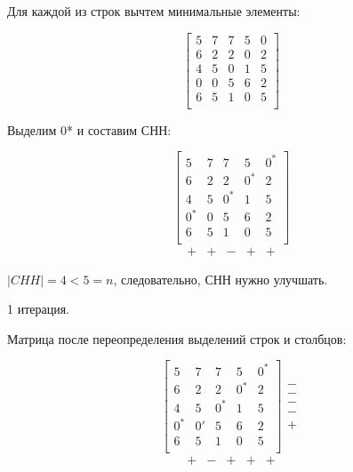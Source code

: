 \documentclass[a4paper,14pt]{article}
\begin{document}
Для каждой из строк вычтем минимальные элементы:

\begin{equation}
\begin{bmatrix}
5  &   7  &   7  &   5  &   0 \\
6  &   2  &   2  &   0  &   2 \\
4  &   5  &   0  &   1  &   5 \\
0  &   0  &   5  &   6  &   2 \\ 
6  &   5  &   1  &   0  &   5 \\
\end{bmatrix}
\end{equation}

Выделим 0* и составим СНН:

\begin{equation}
\begin{bmatrix}
5  &    7  &    7  &    5  &    0^* \\
6  &    2  &    2  &    0^*  &   2 \\
4  &    5  &    0^*  &   1  &    5 \\ 
0^*  &   0  &    5  &    6  &    2 \\
6  &    5  &    1  &    0  &    5 \\
\end{bmatrix}
\end{equation}
\begin{equation}
\begin{matrix}
+ & + & - & + & +
\end{matrix}
\end{equation}

$|CHH| = 4 < 5 = n$, следовательно, СНН нужно улучшать.

1 итерация.

Матрица после переопределения выделений строк и столбцов:

\begin{equation}
\begin{bmatrix}
5  &    7  &    7  &    5  &    0^* \\
6  &    2  &    2  &    0^*  &   2 \\ 
4  &    5  &    0^*  &   1  &    5 \\ 
0^*  &   0'  &   5  &    6  &    2 \\
6  &    5  &    1  &    0  &    5 \\
\end{bmatrix}
\begin{matrix}
- \\
- \\
- \\
- \\
+
\end{matrix}
\end{equation}
\begin{equation}
\begin{matrix}
+ & - & + & + & +
\end{matrix}
\end{equation}
\end{document}
